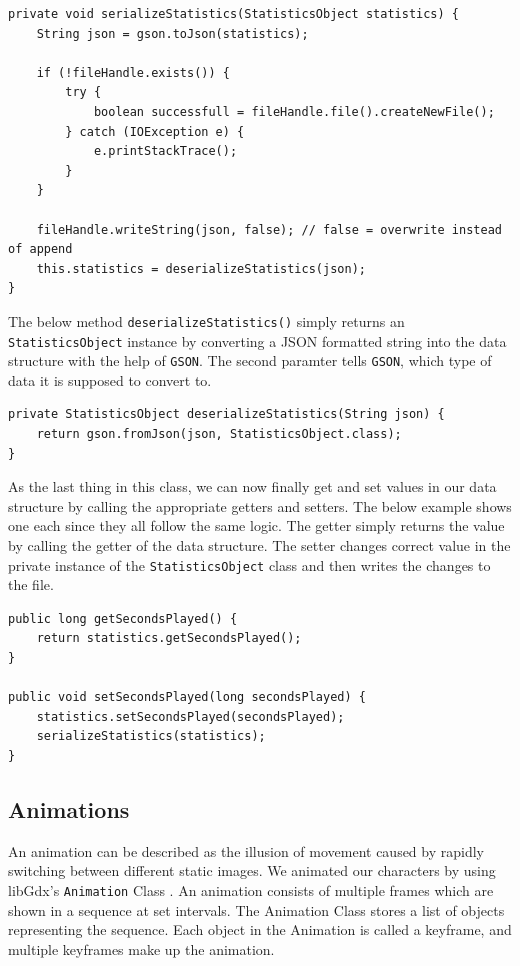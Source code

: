 \documentclass[12p]{article}
\begin{document}
\begin{verbatim}
private void serializeStatistics(StatisticsObject statistics) {
    String json = gson.toJson(statistics);

    if (!fileHandle.exists()) {
        try {
            boolean successfull = fileHandle.file().createNewFile();
        } catch (IOException e) {
            e.printStackTrace();
        }
    }

    fileHandle.writeString(json, false); // false = overwrite instead of append
    this.statistics = deserializeStatistics(json);
}
\end{verbatim}

The below method \texttt{deserializeStatistics()} simply returns an \texttt{StatisticsObject} instance by converting a JSON formatted string into the data structure with the help of \texttt{GSON}. The second paramter tells \texttt{GSON}, which type of data it is supposed to convert to.

\begin{verbatim}
private StatisticsObject deserializeStatistics(String json) {
    return gson.fromJson(json, StatisticsObject.class);
}
\end{verbatim}

As the last thing in this class, we can now finally get and set values in our data structure by calling the appropriate getters and setters. The below example shows one each since they all follow the same logic. The getter simply returns the value by calling the getter of the data structure. The setter changes correct value in the private instance of the \texttt{StatisticsObject} class and then writes the changes to the file.

\begin{verbatim}
public long getSecondsPlayed() {
    return statistics.getSecondsPlayed();
}

public void setSecondsPlayed(long secondsPlayed) {
    statistics.setSecondsPlayed(secondsPlayed);
    serializeStatistics(statistics);
}
\end{verbatim}


\newpage
\subsection{Animations} \label{DocAnimations}

An animation can be described as the illusion of movement caused by rapidly switching between different static images. We animated our characters by using libGdx's \texttt{Animation} Class \cite{libGdxAnimClass}. An animation consists of multiple frames which are shown in a sequence at set intervals. The Animation Class stores a list of objects representing the sequence. Each object in the Animation is called a keyframe, and multiple keyframes make up the animation.
\end{document}
